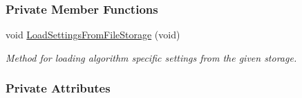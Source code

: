 \subsubsection*{Private Member Functions}
\begin{DoxyCompactItemize}
\item 
void \hyperlink{group___object_recognition_a1cfbc787c7380f981407daf1afbbad12}{Load\-Settings\-From\-File\-Storage} (void)
\begin{DoxyCompactList}\small\item\em Method for loading algorithm specific settings from the given storage. \end{DoxyCompactList}\end{DoxyCompactItemize}
\subsubsection*{Private Attributes}
